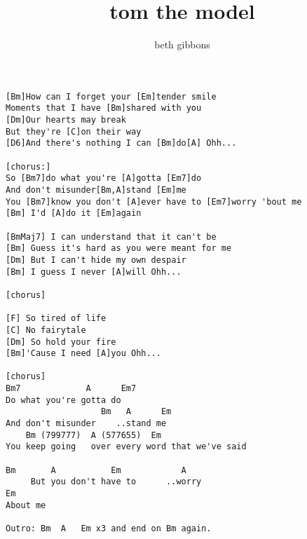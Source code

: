 \author{beth gibbons}
\title{tom the model}
\maketitle
\begin{verbatim}
[Bm]How can I forget your [Em]tender smile
Moments that I have [Bm]shared with you
[Dm]Our hearts may break
But they're [C]on their way
[D6]And there's nothing I can [Bm]do[A] Ohh...

[chorus:]
So [Bm7]do what you're [A]gotta [Em7]do
And don't misunder[Bm,A]stand [Em]me
You [Bm7]know you don't [A]ever have to [Em7]worry 'bout me
[Bm] I'd [A]do it [Em]again

[BmMaj7] I can understand that it can't be
[Bm] Guess it's hard as you were meant for me
[Dm] But I can't hide my own despair
[Bm] I guess I never [A]will Ohh...

[chorus]

[F] So tired of life
[C] No fairytale
[Dm] So hold your fire
[Bm]'Cause I need [A]you Ohh...

[chorus]
Bm7             A      Em7
Do what you're gotta do
                   Bm   A      Em  
And don't misunder    ..stand me
    Bm (799777)  A (577655)  Em
You keep going   over every word that we've said

Bm       A           Em            A
     But you don't have to      ..worry
Em
About me 

Outro: Bm  A   Em x3 and end on Bm again.
\end{verbatim}
